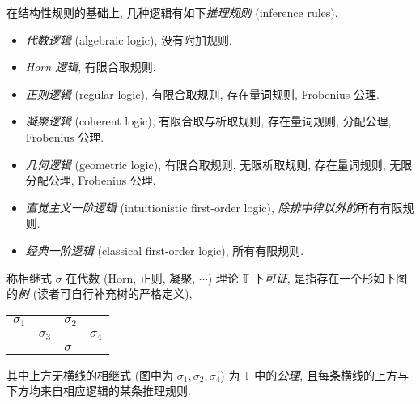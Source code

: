 \begin{definition}
	[label={inference-rules}]
	{}
	在结构性规则的基础上, 几种逻辑有如下\emph{推理规则} (inference rules).
	\begin{itemize}
		\item \emph{代数逻辑} (algebraic logic), 没有附加规则.
		\item \emph{Horn 逻辑}, 有限合取规则.
		\item \emph{正则逻辑} (regular logic), 有限合取规则, 存在量词规则, Frobenius 公理.
		\item \emph{凝聚逻辑} (coherent logic), 有限合取与析取规则, 存在量词规则, 分配公理, Frobenius 公理.
		\item \emph{几何逻辑} (geometric logic), 有限合取规则, 无限析取规则, 存在量词规则, 无限分配公理, Frobenius 公理.
		\item \emph{直觉主义一阶逻辑} (intuitionistic first-order logic), \emph{除排中律以外的}所有有限规则.
		\item \emph{经典一阶逻辑} (classical first-order logic), 所有有限规则.
	\end{itemize}
\end{definition}

\begin{definition}
	[label={first-order-provability}]
	{}
	称相继式 $\sigma$ 在代数 (Horn, 正则, 凝聚, $\cdots$) 理论 $\mathbb T$ 下\emph{可证},
	是指存在一个形如下图的\emph{树} (读者可自行补充树的严格定义),
	\begin{center}
		\begin{tabular}{llll}
			$\sigma_1$ &            & $\sigma_2$ &            \\ \cline{1-3}
			& $\sigma_3$ &            & $\sigma_4$ \\ \cline{2-4} 
			&            & $\sigma$ &           
		\end{tabular}
	\end{center}
	其中上方无横线的相继式 (图中为 $\sigma_1,\sigma_2,\sigma_4$) 为 $\mathbb T$ 中的\emph{公理}, 且每条横线的上方与下方均来自相应逻辑的某条推理规则.
\end{definition}

